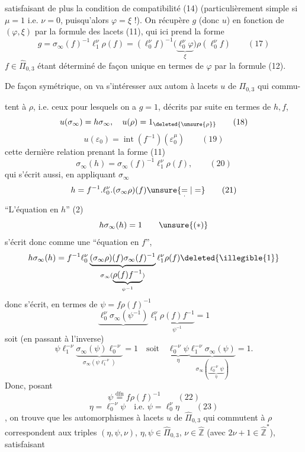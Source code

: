 
satisfaisant de plus la condition de compatibilité (14) (particulièrement simple  si $\mu=1$ i.e. \deleted{$\mu=$} $\nu=0$, puisqu'alors $\varphi=\xi$ !). On récupère $g$ (donc $u$)  en fonction
de $(\varphi,\xi)$ par la formule des lacets (11), qui ici prend la forme
\[
g=\sigma_\infty(f)^{-1}\ell_1^\nu\rho(f)
=(\ell_0^\nu f)^{-1}\bigl(\underbrace{\ell_0^\nu\varphi}_{\xi}\bigr)\rho(\ell_0^\nu f)
\qquad (17)
\]
$f\in\widehat{\Pi}_{0,3}$ étant déterminé de façon unique en termes de $\varphi$ par la formule (12).

De façon symétrique, on va s'intéresser aux autom à lacets $u$ de $\Pi_{0,3}$ qui commu-



tent à $\rho$, i.e. ceux pour lesquels on a $g=1$, décrits par suite en termes de $h,f$,
\[
u(\sigma_\infty)=h\sigma_\infty,\quad u(\rho)=1_{\deleted{\unsure{\rho}}}\qquad (18)
\]
\[
u(\varepsilon_0)=\operatorname{int}(f^{-1})(\varepsilon_0^\mu)
\qquad (19)
\]
cette dernière relation prenant la forme (11)
\[
\sigma_\infty(h)=\sigma_\infty(f)^{-1}\ell_1^\nu\rho(f),
\qquad (20)
\]
qui s'écrit aussi, en appliquant $\sigma_\infty$
\[
h=f^{-1}.\ell_0^\nu.(\sigma_\infty\rho)(f)\unsure{\underset{\cdot}{=}|=}
\qquad (21)
\]
``L'équation en $h$'' (2) 
\[
h\sigma_\infty(h)=1
\qquad \unsure{(*)}
\]
s'écrit donc comme une ``équation en $f$'',  
\[
h\sigma_\infty(h)=f^{-1}\ell_0^\nu
\underbrace{(\sigma_\infty\rho)(f)\sigma_\infty(f)^{-1}}_{\sigma_\infty(\underbrace{\rho(f)f^{-1}}_{\psi^{-1}})}
\ell_1^\nu\rho(f)\deleted{\illegible{1}}
\]
donc  s'écrit, en termes de $\psi=f\rho(f)^{-1}$
\[
\underbrace{\ell_0^\nu\sigma_\infty(\psi^{-1})}\ell_1^\nu
\underbrace{\rho(f)f^{-1}}_{\psi^{-1}}=1
\]
soit (en passant à l'inverse)
\[
\psi\ell_1^{-\nu}\underbrace{\sigma_\infty(\psi)\ell_0^{-\nu}}_{\sigma_\infty(\psi\ell_1^{-\nu})}=1
\quad\text{soit}\quad
\underbrace{\ell_0^{-\nu}\psi}_{\eta}
\underbrace{\ell_1^{-\nu}\sigma_\infty(\psi)}_{\sigma_\infty(\underbrace{\ell_0^{-\nu}\psi}_{\eta})}=1.
\]
Donc, posant
\[
\psi\overset{\mathrm{dfn}}{=}f\rho(f)^{-1}
\qquad (22)
\]
\[
\boxed{\eta=\ell_0^{-\nu}\psi\quad\text{i.e. }\psi=\ell_0^\nu\eta}
\qquad (23)
\]
, on trouve que les automorphismes à lacets $u$ de $\widehat{\Pi}_{0,3}$ qui commutent à $\rho$ correspondent aux triples $(\eta,\psi,\nu)$, $\eta,\psi\in\widehat{\Pi}_{0,3}$, $\nu\in\widehat{\mathbb Z}$ (avec $2\nu+1\in\widehat{\mathbb Z}^{*}$), satisfaisant

